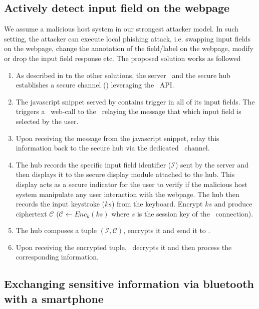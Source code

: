 \subsection{Actively detect input field on the webpage}

We assume a malicious host system in our strongest attacker model. In such setting, the attacker can execute local phishing attack, i.e. swapping input fields on the webpage, change the annotation of the field/label on the webpage, modify or drop the input field response etc. The proposed solution works as followed

\begin{enumerate}
  \item As described in tn the other solutions, the server \server\ and the secure hub establishes a secure channel (\tls) leveraging the \webusb\ API.
 
  \item The javascript snippet served by \server contains \texttt{\onSelect} trigger in all of its input fields. The  \onSelect triggers a \http\ web-call to the \server\ relaying the message that which input field is selected by the user.
  
  \item Upon receiving the message from the javascript snippet, \server relay this information back to the secure hub via the dedicated \tls\ channel.
  
  \item The hub records the specific input field identifier ($\mathcal{I}$) sent by the server and then displays it to the secure display module attached to the hub. This display acts as a secure indicator for the user to verify if the malicious host system manipulate any user interaction with the webpage. The hub then records the input keystroke ($ks$) from the keyboard. Encrypt $ks$ and produce ciphertext $\mathcal{C}$ ($\mathcal{C} \leftarrow Enc_{k}(ks)$ where $s$ is the session key of the \tls\ connection).
  
  \item The hub composes a tuple $(\mathcal{I}, \mathcal{C})$, encrypts it and send it to \server.
  
  \item Upon receiving the encrypted tuple, \server\ decrypts it and then process the corresponding information.
\end{enumerate}
 

  
\subsection{Exchanging sensitive information via bluetooth with a smartphone}


